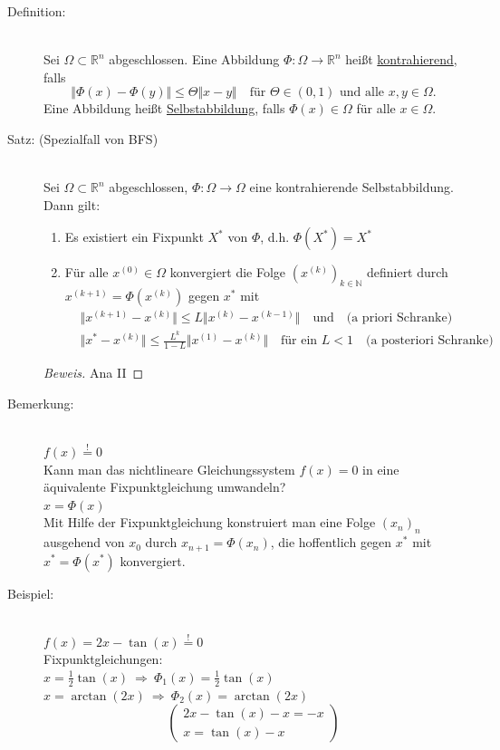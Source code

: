 \documentclass[12pt]{article}
\theoremstyle{break}
\begin{document}
\begin{description}
  \item[Definition:] \leavevmode \\
  Sei $\Omega \subset \mathbb{R}^n$ abgeschlossen. Eine Abbildung $\Phi: \Omega \rightarrow \mathbb{R}^n$ heißt \underline{kontrahierend}, falls
  $$ \Vert \Phi(x) - \Phi(y) \Vert \leq \Theta \Vert x-y \Vert \quad \text{für } \Theta \in (0,1) \text{ und alle } x, y \in \Omega.$$
  Eine Abbildung heißt \underline{Selbstabbildung}, falls $\Phi(x) \in \Omega$ für alle $x \in \Omega$.
  
  \item[Satz: (Spezialfall von BFS)] \leavevmode \\
  Sei $\Omega \subset \mathbb{R}^n$ abgeschlossen, $\Phi: \Omega \rightarrow \Omega$ eine kontrahierende Selbstabbildung. Dann gilt:
  \renewcommand{\labelenumi}{\roman{enumi})}
  \begin{enumerate}
    \item Es existiert ein Fixpunkt $X^*$ von $\Phi$, d.h. $\Phi(X^*) = X^*$
    \item Für alle $x^{(0)} \in \Omega$ konvergiert die Folge $(x^{(k)})_{k \in \mathbb{N}}$ definiert durch $x^{(k+1)} = \Phi(x^{(k)})$ gegen $x^*$ mit 
    \begin{align*}
      &\Vert x^{(k+1)} - x^{(k)} \Vert \leq L \Vert x^{(k)} - x^{(k-1)} \Vert \quad \text{und} \quad \text{(a priori Schranke)}  &\\
      &\Vert x^* - x^{(k)} \Vert \leq \frac{L^k}{1-L} \Vert x^{(1)} - x^{(k)} \Vert \quad \text{für ein } L < 1 \quad \text{(a posteriori Schranke)}
    \end{align*}
  \end{enumerate}
  \begin{proof}[Beweis] 
  Ana II
  \end{proof}
  
  \item[Bemerkung:] \leavevmode \\
  $f(x) \overset{!}{=} 0$ \\
  Kann man das nichtlineare Gleichungssystem $f(x) = 0$ in eine äquivalente Fixpunktgleichung umwandeln?\\
  $x = \Phi(x)$ \\
  Mit Hilfe der Fixpunktgleichung konstruiert man eine Folge $(x_n)_n$ ausgehend von $x_0$ durch $x_{n+1} = \Phi(x_n)$, die hoffentlich gegen $x^*$ mit $x^* = \Phi(x^*)$ konvergiert.
  
  \item[Beispiel:] \leavevmode \\
  $f(x) = 2x - \tan(x) \overset{!}{=} 0$ \\
  Fixpunktgleichungen:\\
  $x = \frac{1}{2} \tan(x) \medspace \Rightarrow \medspace \Phi_1(x) = \frac{1}{2} \tan(x)$ \\
  $x = \arctan(2x) \medspace \Rightarrow \medspace \Phi_2(x) = \arctan(2x)$ 
  $$\left( \begin{array}{l} 2x - \tan(x) - x = -x \\ x = \tan(x) -x \end{array} \right)$$
\end{description}
\end{document}
